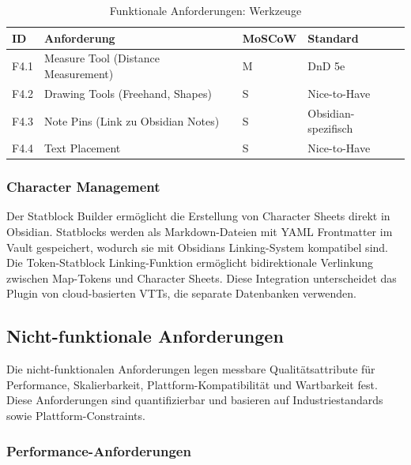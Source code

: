 \begin{table}[htbp]
	\centering
	\small
	\caption{Funktionale Anforderungen: Werkzeuge}
	\label{tab:funktionale-anforderungen-werkzeuge}
	\begin{tabularx}{\textwidth}{llXl}
		\toprule
		\textbf{ID} & \textbf{Anforderung}                & \textbf{MoSCoW} & \textbf{Standard}   \\
		\midrule
		F4.1        & Measure Tool (Distance Measurement) & M               & \ac{DnD} 5e         \\
		F4.2        & Drawing Tools (Freehand, Shapes)    & S               & Nice-to-Have        \\
		F4.3        & Note Pins (Link zu Obsidian Notes)  & S               & Obsidian-spezifisch \\
		F4.4        & Text Placement                      & S               & Nice-to-Have        \\
		\bottomrule
	\end{tabularx}
\end{table}

\subsubsection{Character Management}

Der Statblock Builder ermöglicht die Erstellung von Character Sheets direkt in Obsidian. Statblocks werden als Markdown-Dateien mit \ac{YAML} Frontmatter im Vault gespeichert, wodurch sie mit Obsidians Linking-System kompatibel sind. Die Token-Statblock Linking-Funktion ermöglicht bidirektionale Verlinkung zwischen Map-Tokens und Character Sheets. Diese Integration unterscheidet das Plugin von cloud-basierten \ac{VTT}s, die separate Datenbanken verwenden.

\subsection{Nicht-funktionale Anforderungen}

Die nicht-funktionalen Anforderungen legen messbare Qualitätsattribute für Performance, Skalierbarkeit, Plattform-Kompatibilität und Wartbarkeit fest. Diese Anforderungen sind quantifizierbar und basieren auf Industriestandards sowie Plattform-Constraints.

\subsubsection{Performance-Anforderungen}

